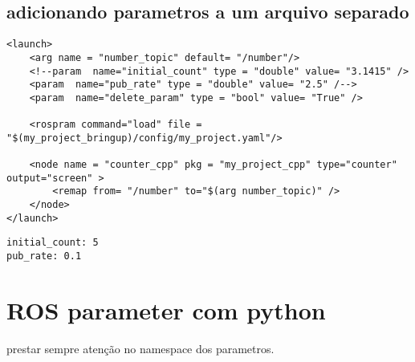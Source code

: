 \documentclass[letterpaper]{article}
\begin{document}
\subsection{adicionando parametros a um arquivo separado}
\begin{lstlisting}[style=xmlstyle, title=counter\_cpp.launch] 
<launch>
    <arg name = "number_topic" default= "/number"/>
    <!--param  name="initial_count" type = "double" value= "3.1415" />
    <param  name="pub_rate" type = "double" value= "2.5" /-->
    <param  name="delete_param" type = "bool" value= "True" />
    
    <rospram command="load" file = "$(my_project_bringup)/config/my_project.yaml"/>

    <node name = "counter_cpp" pkg = "my_project_cpp" type="counter" output="screen" >   
        <remap from= "/number" to="$(arg number_topic)" />  
    </node> 
</launch>
\end{lstlisting}
\begin{lstlisting}[style=mystyle, title=my\_project.yaml] 
initial_count: 5
pub_rate: 0.1
\end{lstlisting}

\section{ROS parameter com python}
prestar sempre atenção no namespace  dos parametros.
\end{document}
